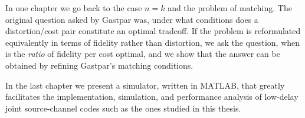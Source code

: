\documentclass[a4paper]{article}
\theoremstyle{definition}
\begin{document}
In one chapter we go back to the case $n=k$ and the problem of matching. The
original question asked by Gastpar was, under what conditions does a
distortion/cost pair constitute an optimal tradeoff. If the problem is
reformulated equivalently in terms of fidelity rather than distortion, we ask
the question, when is the \emph{ratio} of fidelity per cost optimal, and we show
that the answer can be obtained by refining Gastpar's matching conditions. 

In the last chapter we present a simulator, written in MATLAB, that greatly
facilitates the implementation, simulation, and performance analysis of
low-delay joint source-channel codes such as the ones studied in this thesis. 

%
\end{document}
